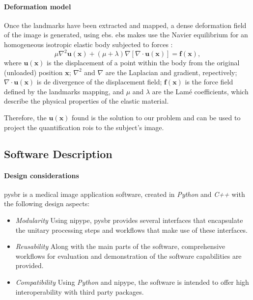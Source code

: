 \documentclass{frontiers}
\newcommand{\vect}[1]{\ensuremath{\mathbf{#1}}}
\newcommand{\emitem}[1]{\item \emph{#1}}
\begin{document}
\paragraph{Deformation model}
\label{sec:deformation}
Once the landmarks have been extracted and mapped, a dense deformation field of the image
  is generated, using \gls*{ebs}. \gls*{ebs} makes use the Navier 
  equilibrium  for an homogeneous isotropic elastic body
  subjected to forces \citep{davis_physics-based_1997}:
  \begin{equation}
    \label{eq:ebs_pde}
    \mu \nabla^2 \vect{u}(\vect{x}) + (\mu+\lambda) \nabla \left[ \nabla \cdot \vect{u}(\vect{x}) \right] = \vect{f}(\vect{x}),
  \end{equation}
  where $\vect{u}(\vect{x})$ is the displacement of a point within the body
  from the original (unloaded) position $\vect{x}$; $\nabla^2$ and $\nabla$
  are the Laplacian and gradient, repectively; $\nabla \cdot \vect{u}(\vect{x})$
  is de divergence of the displacement field; $\vect{f}(\vect{x})$ is the force
  field defined by the landmarks mapping, and $\mu$ and $\lambda$ are the Lam\'e
  coefficients, which describe the physical properties of the elastic material.

Therefore, the $\vect{u}(\vect{x})$ found is the solution to our problem and
  can be used to project the quantification \glspl*{roi} to the subject's image.

\subsection{Software Description}
\label{sec:software}
\paragraph{Design considerations}
\label{sec:design}

\Gls*{pysbr} is a medical image application software, created
  in \emph{Python} and \emph{C++} with the following design aspects:

\begin{itemize}
  \emitem{Modularity} Using \gls*{nipype}, \gls*{pysbr} provides
    several interfaces that encapsulate the unitary processing steps
    and workflows that make use of these interfaces.

  \emitem{Reusability} Along with the main parts of the software,
    comprehensive workflows for evaluation and demonstration of the 
    software capabilities are provided.

  \emitem{Compatibility} Using \emph{Python} and \gls*{nipype}, the
    software is intended to offer high interoperability with third party
      packages.
\end{itemize}
\end{document}
